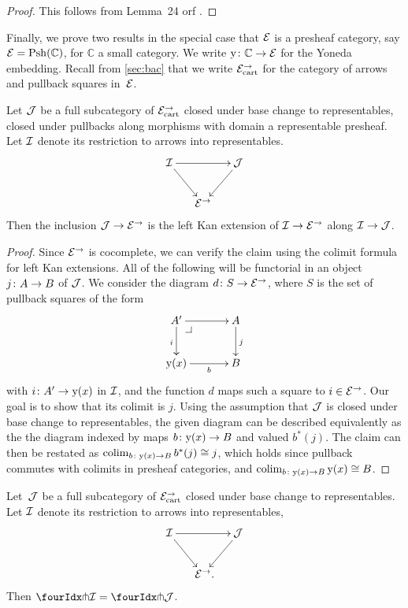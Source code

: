 \documentclass[reqno,10pt,a4paper,oneside,draft]{amsart}
\begin{document}
{{\begin{proof}
This follows from Lemma~24 orf \cite{bourke-garner-I}.
\end{proof}

Finally, we prove two results in the special case that $\catE$ is a presheaf category, say $\cal{E} = \Psh(\mathbb{C})$, for $\mathbb{C}$ a small category.
We write $\yon \co \mathbb{C} \to \cal{E}$ for the Yoneda embedding.
Recall from \cref{sec:bac} that we write $\catE_{\cart}^\to$ for the category of arrows and pullback squares in~$\cal{E}$.

\begin{lemma} \label{left-kan-extension-of-representables}
Let $\cal{J}$ be a full subcategory of $\catE_{\cart}^\to$ closed under base change to representables, \ie closed under pullbacks along morphisms with domain a representable presheaf.
Let $\cal{I}$ denote its restriction to arrows into representables.
\[
\xymatrix@C-1em{
  \cal{I}
  \ar[rr]
  \ar[dr]
&&
  \cal{J}
  \ar[dl]
\\&
  \catE^\to
}
\]
Then the inclusion $\cal{J} \to \catE^\to$ is the left Kan extension of $\cal{I} \to \catE^\to$ along $\cal{I} \to \cal{J}$.
\end{lemma}

\begin{proof}
Since $\catE^\to$ is cocomplete, we can verify the claim using the colimit formula for left Kan extensions.
All of the following will be functorial in an object $j \co A \to B$ of $\cal{J}$.
We consider the diagram $d \co S \to \catE^\to$, where $S$ is the set of pullback squares of the form
\[
\xymatrix@C=1.2cm{
  A'
  \ar[r]
  \ar[d]_{i}
  \pullback{dr}
&
  A
  \ar[d]^{j}
\\
  \yon(x)
  \ar[r]_-{b}
&
  B
}
\]
with $i \co A' \to \yon(x)$ in $\cal{I}$, and the function $d$ maps such a square to $i \in \cal{E}^\to$.
Our goal is to show that its colimit is $j$.
Using the assumption that $\cal{J}$ is closed under base change to representables, the given diagram can be described equivalently as the the diagram indexed by maps $b \co \yon(x) \to B$ and valued $b^*(j)$.
The claim can then be restated as $\colim_{b \co \yon(x) \to B} b^*(j) \iso j$, which holds since pullback commutes with colimits in presheaf categories, and $\colim_{b \co \yon(x) \to B} \yon(x) \iso B$.
\end{proof}

\begin{proposition} \label{awfs-on-arrows-into-representables}
Let~$\cal{J}$ be a full subcategory of $\catE_{\cart}^\to$ closed under base change to representables.
Let $\cal{I}$ denote its restriction to arrows into representables,
\[
\xymatrix@C-1em{
  \cal{I}
  \ar[rr]
  \ar[dr]
&&
  \cal{J}
  \ar[dl]
\\&
  \catE^\to
\rlap{.}}
\]
Then $\liftr{\cal{I}} = \liftr{\cal{J}}$.
\end{proposition}

}}
\end{document}
